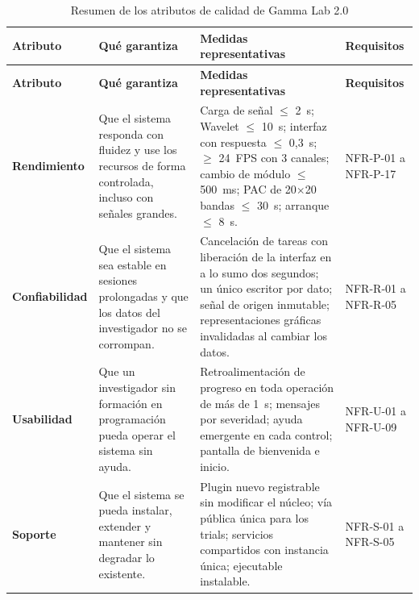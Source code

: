 \documentclass[11pt,a4paper]{article}
\DeclareRobustCommand{\_}{\textunderscore\allowbreak}
\begin{document}
\begin{longtable}{@{}>{\raggedright\arraybackslash}p{2.7cm}
                  >{\raggedright\arraybackslash}p{4.0cm}
                  >{\raggedright\arraybackslash}p{4.8cm}
                  >{\raggedright\arraybackslash}p{2.2cm}@{}}

\caption{Resumen de los atributos de calidad de Gamma Lab 2.0} \label{tab:resumen_atributos} \\
\toprule
\textbf{Atributo} &
\textbf{Qué garantiza} &
\textbf{Medidas representativas} &
\textbf{Requisitos} \\
\midrule
\endfirsthead

\toprule
\textbf{Atributo} &
\textbf{Qué garantiza} &
\textbf{Medidas representativas} &
\textbf{Requisitos} \\
\midrule
\endhead

\bottomrule
\endlastfoot

\textbf{Rendimiento}
&
Que el sistema responda con fluidez y use los recursos de forma controlada, incluso con señales grandes.
&
Carga de señal $\leq$ 2~s; Wavelet $\leq$ 10~s; interfaz con respuesta $\leq$ 0,3~s; $\geq$ 24~FPS con 3 canales; cambio de módulo $\leq$ 500~ms; PAC de 20$\times$20 bandas $\leq$ 30~s; arranque $\leq$ 8~s.
&
NFR-P-01 a NFR-P-17
\\[0.2cm]

\textbf{Confiabilidad}
&
Que el sistema sea estable en sesiones prolongadas y que los datos del investigador no se corrompan.
&
Cancelación de tareas con liberación de la interfaz en a lo sumo dos segundos; un único escritor por dato; señal de origen inmutable; representaciones gráficas invalidadas al cambiar los datos.
&
NFR-R-01 a NFR-R-05
\\[0.2cm]

\textbf{Usabilidad}
&
Que un investigador sin formación en programación pueda operar el sistema sin ayuda.
&
Retroalimentación de progreso en toda operación de más de 1~s; mensajes por severidad; ayuda emergente en cada control; pantalla de bienvenida e inicio.
&
NFR-U-01 a NFR-U-09
\\[0.2cm]

\textbf{Soporte}
&
Que el sistema se pueda instalar, extender y mantener sin degradar lo existente.
&
Plugin nuevo registrable sin modificar el núcleo; vía pública única para los trials; servicios compartidos con instancia única; ejecutable instalable.
&
NFR-S-01 a NFR-S-05
\\

\end{longtable}
\end{document}
